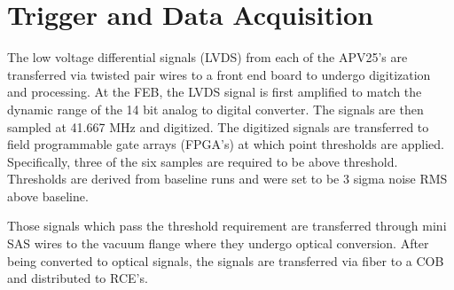 \section{Trigger and Data Acquisition}

The low voltage differential signals (LVDS) from each of the APV25's are 
transferred via twisted pair wires to a front end board to undergo digitization
and processing.  At the FEB, the LVDS signal is first amplified to match the 
dynamic range of the 14 bit analog to digital converter.  The signals are then
sampled at 41.667 MHz and digitized.  The digitized signals are transferred to 
 field programmable gate arrays (FPGA's) at which point thresholds are applied.
 Specifically, three of the six samples are required to be above threshold.  
 Thresholds are derived from baseline runs and were set to be 3 sigma noise RMS
 above baseline.

 Those signals which pass the threshold requirement are transferred through 
 mini SAS wires to the vacuum flange where they undergo optical conversion.
 After being converted to optical signals, the signals are transferred via 
 fiber to a COB and distributed to RCE's.



